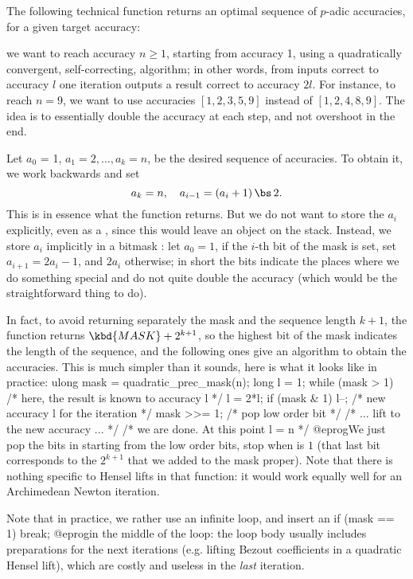 
The following technical function returns an optimal sequence of $p$-adic
accuracies, for a given target accuracy:

 we want to reach accuracy
$n\geq 1$, starting from accuracy 1, using a quadratically convergent,
self-correcting, algorithm; in other words, from inputs correct to accuracy
$l$ one iteration outputs a result correct to accuracy $2l$.
For instance, to reach $n = 9$, we want to use accuracies
$[1,2,3,5,9]$ instead of $[1,2,4,8,9]$. The idea is to essentially double
the accuracy at each step, and not overshoot in the end.

Let $a_0$ = 1, $a_1 = 2, \ldots, a_k = n$, be the desired sequence of
accuracies. To obtain it, we work backwards and set
$$ a_k = n,\quad a_{i-1} = (a_i + 1)\,\bs\, 2.$$
This is in essence what the function returns.
But we do not want to store the $a_i$ explicitly, even as a ,
since this would leave an object on the stack. Instead, we store $a_i$
implicitly in a bitmask : let $a_0 = 1$, if the $i$-th bit of the
mask is set, set $a_{i+1} = 2a_i - 1$, and $2a_i$ otherwise; in short the
bits indicate the places where we do something special and do not quite
double the accuracy (which would be the straightforward thing to do).

In fact, to avoid returning separately the mask and the sequence length
$k+1$, the function returns $\kbd{MASK} + 2^{k+1}$, so the highest bit of
the mask indicates the length of the sequence, and the following ones give
an algorithm to obtain the accuracies. This is much simpler than it sounds,
here is what it looks like in practice:
\bprog
  ulong mask = quadratic_prec_mask(n);
  long l = 1;
  while (mask > 1) {            /* here, the result is known to accuracy l */
    l = 2*l; if (mask & 1) l--; /* new accuracy l for the iteration */
    mask >>= 1;                 /* pop low order bit */
    /* ... lift to the new accuracy ... */
  }
  /* we are done. At this point l = n */
@eprog\noindent We just pop the bits in  starting from the low
order bits, stop when  is $1$ (that last bit corresponds to the
$2^{k+1}$ that we added to the mask proper). Note that there is nothing
specific to Hensel lifts in that function: it would work equally well for
an Archimedean Newton iteration.

Note that in practice, we rather use an infinite loop, and insert an
\bprog
  if (mask == 1) break;
@eprog\noindent in the middle of the loop: the loop body usually includes
preparations for the next iterations (e.g. lifting Bezout coefficients
in a quadratic Hensel lift), which are costly and useless in the \emph{last}
iteration.

